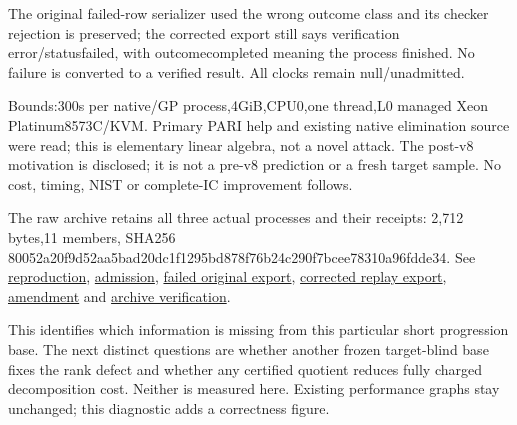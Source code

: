 \documentclass[
  10pt,
]{article}
\begin{document}
The original failed-row serializer used the wrong outcome class and its
checker rejection is preserved; the corrected export still says
verification error/statusfailed, with outcomecompleted meaning the
process finished. No failure is converted to a verified result. All
clocks remain null/unadmitted.

Bounds:300s per native/GP process,4GiB,CPU0,one thread,L0 managed Xeon
Platinum8573C/KVM. Primary PARI help and existing native elimination
source were read; this is elementary linear algebra, not a novel attack.
The post-v8 motivation is disclosed; it is not a pre-v8 prediction or a
fresh target sample. No cost, timing, NIST or complete-IC improvement
follows.

The raw archive retains all three actual processes and their receipts:
2,712 bytes,11 members, SHA256
80052a20\allowbreak{}f9d52aa5\allowbreak{}bad20dc1\allowbreak{}f1295bd8\allowbreak{}78f76b24\allowbreak{}c290f7bc\allowbreak{}ee78310a\allowbreak{}96fdde34. See
\href{../../execution-v9/README.md}{reproduction},
\href{../../execution-v9/ADMISSION.json}{admission},
\href{../../execution-v9/experiment.original.export.json}{failed
original export},
\href{../../execution-v9/experiment.export.json}{corrected replay
export}, \href{../../execution-v9/PARI_AMENDMENT_V2.md}{amendment} and
\href{../../execution-v9/RAW_VERIFICATION.json}{archive verification}.

This identifies which information is missing from this particular short
progression base. The next distinct questions are whether another frozen
target-blind base fixes the rank defect and whether any certified
quotient reduces fully charged decomposition cost. Neither is measured
here. Existing performance graphs stay unchanged; this diagnostic adds a
correctness figure.
\end{document}

